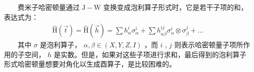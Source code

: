 \documentclass[a4paper,11pt,english]{sphinxmanual}
\begin{document}
\sphinxAtStartPar
{}

\sphinxAtStartPar
  费米子哈密顿量通过  \(\mathrm{J}-\mathrm{W}\) 变换变成泡利算子形式时，它是若干子项的和，表达式为：
\begin{equation*}
\begin{split}\mathrm{\hat{H}}(\vec{t})=\mathrm{\hat{H}}(\vec{h})=\sum h_{\alpha}^{i} \sigma_{\alpha}^{i}+\sum h_{\alpha \beta}^{i j} \sigma_{\alpha}^{i} \otimes \sigma_{\beta}^{j}+\ldots\end{split}
\end{equation*}
\sphinxAtStartPar
  其中 \(\sigma\) 是泡利算子，  \(\alpha, \beta \in(X, Y, Z, I)\) ，而  \(i\) ,  \(j\) 则表示哈密顿量子项所作用的子空间，  \(h\) 是实数。但是，如果对这些子项进行求和，最后得到的泡利算子形式哈密顿量想要对角化以生成酉算子，是比较困难的。
\end{document}
